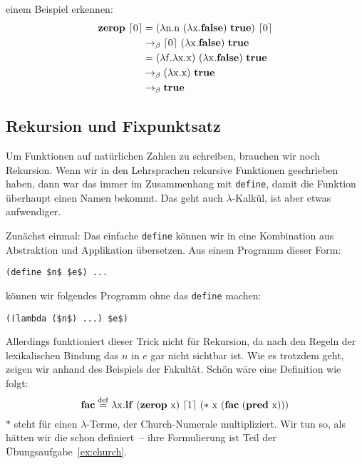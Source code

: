 einem Beispiel erkennen:
%
\begin{displaymath}
  \begin{split}
    \mathbf{zerop}~\lceil 0\rceil & =
    (\lambda \mathrm n.\mathrm n~(\lambda \mathrm x.\mathbf{false})~\mathbf{true})~\lceil 0\rceil\\
    & \rightarrow_\beta \lceil 0\rceil~(\lambda \mathrm x.\mathbf{false})~\mathbf{true}\\
    & = (\lambda \mathrm f.\lambda \mathrm x.\mathrm x)~(\lambda \mathrm x.\mathbf{false})~\mathbf{true}\\
    & \rightarrow_\beta (\lambda \mathrm x.\mathrm x)~\mathbf{true}\\
    & \rightarrow_\beta \mathbf{true}
  \end{split}
\end{displaymath}
%

\subsection{Rekursion und Fixpunktsatz}
\label{sec:fixpunktsatz}
%
Um Funktionen auf natürlichen Zahlen zu schreiben, brauchen wir noch
Rekursion.  Wenn wir in den Lehrsprachen rekursive Funktionen
geschrieben haben, dann war das immer im Zusammenhang mit
\lstinline{define}, damit die Funktion überhaupt einen Namen bekommt.
Das geht auch $\lambda$-Kalkül, ist aber etwas aufwendiger.

Zunächst einmal: Das einfache \lstinline{define} können wir in eine
Kombination aus Abstraktion und Applikation übersetzen.  Aus einem
Programm dieser Form:
%
\begin{lstlisting}
(define $n$ $e$) ...
\end{lstlisting}
%
können wir folgendes Programm ohne das \lstinline{define} machen:
%
\begin{lstlisting}
((lambda ($n$) ...) $e$)
\end{lstlisting}
%
Allerdings funktioniert dieser Trick nicht für Rekursion, da nach den
Regeln der lexikalischen Bindung das $n$ in $e$ gar nicht sichtbar
ist.  Wie es trotzdem geht, zeigen wir anhand des Beispiels der Fakultät.
Schön wäre eine Definition wie folgt:
%
\begin{displaymath}
  \mathbf{fac} \stackrel{\rm def}{=}{} \lambda \mathrm x.\mathbf{if}~(\mathbf{zerop}~\mathrm
  x)~\lceil 1\rceil ~(\ast~\mathrm x~(\mathbf{fac}~(\mathbf{pred}~\mathrm x)))
\end{displaymath}
%
$\ast$ steht für einen $\lambda$-Terme, der Church-Numerale
multipliziert.  Wir tun so, als
hätten wir die schon definiert~-- ihre Formulierung ist Teil der
Übungsaufgabe~\ref{ex:church}.

